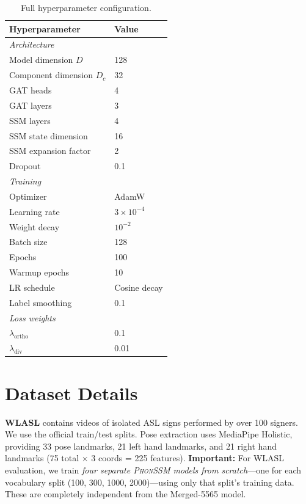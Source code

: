 \documentclass{article}
\theoremstyle{definition}
\theoremstyle{remark}
\newcommand{\phonssm}{\textsc{PhonSSM}}
\begin{document}
\begin{table}[ht]
\caption{Full hyperparameter configuration.}
\label{tab:hyperparams}
\vspace{-1mm}
\begin{center}
\begin{small}
\begin{tabular*}{\columnwidth}{@{\extracolsep{\fill}}ll@{}}
\toprule
Hyperparameter & Value \\
\midrule
\multicolumn{2}{l}{\textit{Architecture}} \\
Model dimension $D$ & 128 \\
Component dimension $D_c$ & 32 \\
GAT heads & 4 \\
GAT layers & 3 \\
SSM layers & 4 \\
SSM state dimension & 16 \\
SSM expansion factor & 2 \\
Dropout & 0.1 \\
\midrule
\multicolumn{2}{l}{\textit{Training}} \\
Optimizer & AdamW \\
Learning rate & $3 \times 10^{-4}$ \\
Weight decay & $10^{-2}$ \\
Batch size & 128 \\
Epochs & 100 \\
Warmup epochs & 10 \\
LR schedule & Cosine decay \\
Label smoothing & 0.1 \\
\midrule
\multicolumn{2}{l}{\textit{Loss weights}} \\
$\lambda_{\text{ortho}}$ & 0.1 \\
$\lambda_{\text{div}}$ & 0.01 \\
\bottomrule
\end{tabular*}
\end{small}
\end{center}
\vspace{-2mm}
\end{table}

\section{Dataset Details}
\label{app:datasets}

\textbf{WLASL} \citep{li2020word} contains videos of isolated ASL signs performed by over 100 signers. We use the official train/test splits. Pose extraction uses MediaPipe Holistic, providing 33 pose landmarks, 21 left hand landmarks, and 21 right hand landmarks (75 total $\times$ 3 coords = 225 features). \textbf{Important:} For WLASL evaluation, we train \textit{four separate \phonssm{} models from scratch}---one for each vocabulary split (100, 300, 1000, 2000)---using only that split's training data. These are completely independent from the Merged-5565 model.
\end{document}
